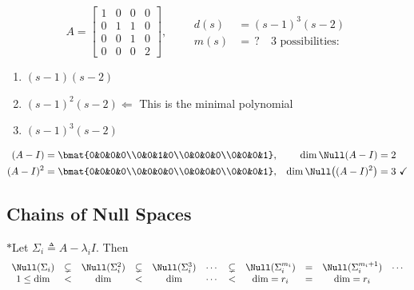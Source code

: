 \begin{example}
\[
A=\left[\begin{array}{ccc|c}1&0&0&0\\0&1&1&0\\0&0&1&0\\\hline 0&0&0&2\end{array}\right],
\qquad
\begin{aligned}
d(s)&=(s-1)^3(s-2)\\
m(s)&=\,?\quad\text{3 possibilities:}
\end{aligned}
\]
\begin{enumerate}[label=\arabic*)]
\item $(s-1)(s-2)$
\item $(s-1)^2(s-2)$\quad $\Leftarrow$ This is the minimal polynomial
\item $(s-1)^3(s-2)$
\end{enumerate}
\begin{align*}
(A-I)&=\bmat{0&0&0&0\\0&0&1&0\\0&0&0&0\\0&0&0&1}, & \dim\Null(A-I)&=2\\
(A-I)^2&=\bmat{0&0&0&0\\0&0&0&0\\0&0&0&0\\0&0&0&1}, & \dim\Null\big((A-I)^2\big)&=3\ \checkmark
\end{align*}
\end{example}

\subsection{Chains of Null Spaces}\label{ss:nullspace-chains}
%
$\ast$\quad Let $\Sigma_i \triangleq A-\lambda_iI$. Then
\[
\begin{array}{ccccccccccc}
\Null(\Sigma_i) & \subsetneq & \Null(\Sigma_i^2) & \subsetneq & \Null(\Sigma_i^3) & \cdots & \subsetneq & \Null(\Sigma_i^{m_i}) & = & \Null(\Sigma_i^{m_i+1}) & \cdots\\
1\le\dim & < & \dim & < & \dim & \cdots & < & \dim=r_i & = & \dim=r_i &
\end{array}
\]

